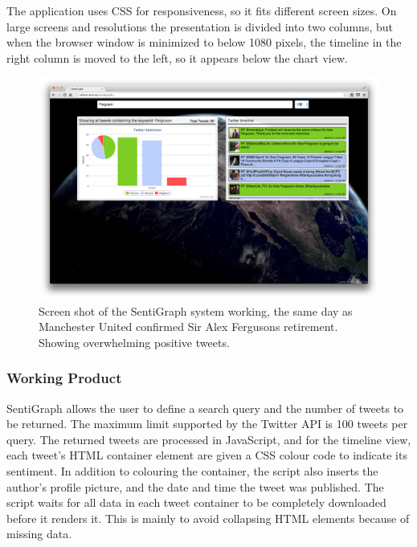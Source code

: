The application uses CSS for responsiveness, so it fits different screen sizes. On large screens and resolutions the presentation is divided into two columns, but when the browser window is minimized to below 1080 pixels, the timeline in the right column is moved to the left, so it appears below the chart view.

\begin{figure}[htb!]
\begin{center}
 \includegraphics[width=\textwidth]{../img/screenshot_sentigraph.png}
 \caption[SentiGraph screen shot]{Screen shot of the SentiGraph system working, the same day as Manchester United confirmed Sir Alex Fergusons retirement. Showing overwhelming positive tweets.}
 \label{fig:sentigraph_screenshot}
\end{center}
\end{figure}

\subsubsection{Working Product}

SentiGraph allows the user to define a search query and the number of tweets to be returned. The maximum limit supported by the Twitter API is 100 tweets per query. The returned tweets are processed in JavaScript, and for the timeline view, each tweet's HTML container element are given a CSS colour code to indicate its sentiment. In addition to colouring the container, the script also inserts the author's profile picture, and the date and time the tweet was published. The script waits for all data in each tweet container to be completely downloaded before it renders it. This is mainly to avoid collapsing HTML elements because of missing data.


